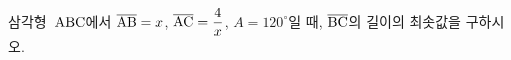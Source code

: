 삼각형~$\mathrm{ABC}$에서 $\overline{\mathrm{AB}}=x$, $\overline{\mathrm{AC}}=\dfrac{4}{x}$, $A=120^\circ$일 때, $\overline{\mathrm{BC}}$의 길이의 최솟값을 구하시오.
